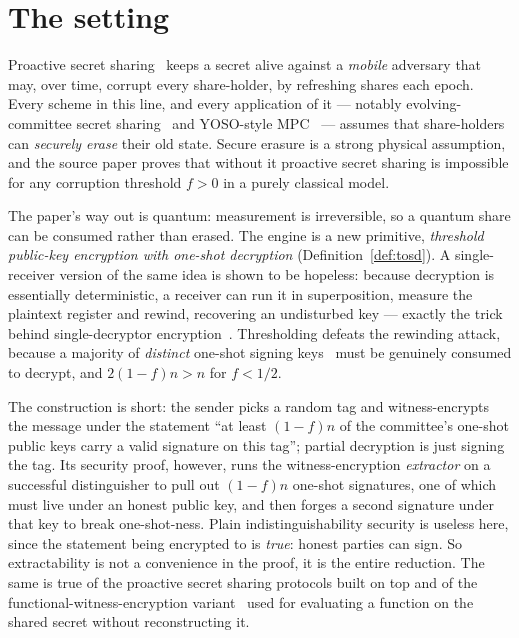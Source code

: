 \documentclass{conjura-conjecture}
\begin{document}
\section{The setting}\label{sec:setting}

Proactive secret sharing~\cite{OY91,HJKY95} keeps a secret alive
against a \emph{mobile} adversary that may, over time, corrupt every
share-holder, by refreshing shares each epoch. Every scheme in this
line, and every application of it --- notably evolving-committee
secret sharing~\cite{BGG+20} and YOSO-style MPC~\cite{GHK+21} ---
assumes that share-holders can \emph{securely erase} their old state.
Secure erasure is a strong physical assumption, and the source paper
proves that without it proactive secret sharing is impossible for any
corruption threshold $f > 0$ in a purely classical model.

The paper's way out is quantum: measurement is irreversible, so a
quantum share can be consumed rather than erased. The engine is a new
primitive, \emph{threshold public-key encryption with one-shot
decryption} (Definition~\ref{def:tosd}). A single-receiver version of
the same idea is shown to be hopeless: because decryption is
essentially deterministic, a receiver can run it in superposition,
measure the plaintext register and rewind, recovering an undisturbed
key --- exactly the trick behind single-decryptor
encryption~\cite{GZ20}. Thresholding defeats the rewinding attack,
because a majority of \emph{distinct} one-shot signing
keys~\cite{AGKZ20,SZ25,HV25} must be genuinely consumed to decrypt,
and $2(1-f)n > n$ for $f < 1/2$.

The construction is short: the sender picks a random tag and
witness-encrypts~\cite{GGSW13} the message under the statement ``at
least $(1-f)n$ of the committee's one-shot public keys carry a valid
signature on this tag''; partial decryption is just signing the tag.
Its security proof, however, runs the witness-encryption
\emph{extractor} on a successful distinguisher to pull out $(1-f)n$
one-shot signatures, one of which must live under an honest public
key, and then forges a second signature under that key to break
one-shot-ness. Plain indistinguishability security is useless here,
since the statement being encrypted to is \emph{true}: honest parties
can sign. So extractability is not a convenience in the proof, it is
the entire reduction. The same is true of the proactive secret sharing
protocols built on top and of the functional-witness-encryption
variant~\cite{BCP14} used for evaluating a function on the shared
secret without reconstructing it.
\end{document}
